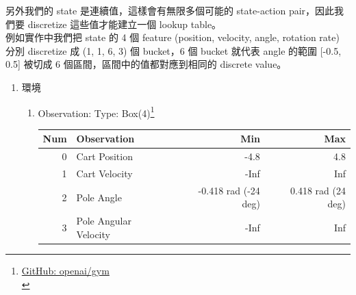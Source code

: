 \documentclass[a4paper,12pt]{article}
\begin{document}
\begin{enumerate}
另外我們的 state 是連續值，這樣會有無限多個可能的 state-action pair，因此我們要 discretize 這些值才能建立一個 lookup table。\\

例如實作中我們把 state 的 4 個 feature (position, velocity, angle, rotation rate) 分別 discretize 成 (1, 1, 6, 3) 個 bucket，6 個 bucket 就代表 angle 的範圍 [-0.5, 0.5] 被切成 6 個區間，區間中的值都對應到相同的 discrete value。\\
\begin{enumerate}
\item 環境
\label{sec:orgfdc0335}
\begin{enumerate}
\item Observation:
\label{sec:org3ce774a}
Type: Box(4)\footnote{\href{https://github.com/openai/gym/blob/master/gym/envs/classic\_control/cartpole.py}{GitHub: openai/gym }\\\label{org43ed28a}}\\
\begin{center}
\begin{tabular}{rlrr}
Num & Observation & Min & Max\\
\hline
0 & Cart Position & -4.8 & 4.8\\
1 & Cart Velocity & -Inf & Inf\\
2 & Pole Angle & -0.418 rad (-24 deg) & 0.418 rad (24 deg)\\
3 & Pole Angular Velocity & -Inf & Inf\\
\end{tabular}
\end{center}


\end{enumerate}
\end{enumerate}
\end{enumerate}
\end{document}
